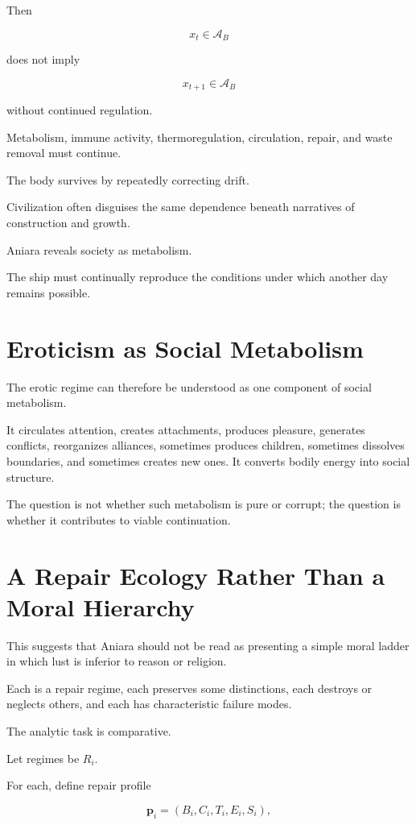 \documentclass[11pt,oneside]{book}
\theoremstyle{definition}
\theoremstyle{remark}
\newcommand{\A}{\mathcal{A}}
\begin{document}
Then

\[
x_t\in\A_B
\]

does not imply

\[
x_{t+1}\in\A_B
\]

without continued regulation.

Metabolism, immune activity, thermoregulation, circulation, repair, and waste removal must continue.

The body survives by repeatedly correcting drift.

Civilization often disguises the same dependence beneath narratives of construction and growth.

Aniara reveals society as metabolism.

The ship must continually reproduce the conditions under which another day remains possible.

\section{Eroticism as Social Metabolism}

The erotic regime can therefore be understood as one component of social metabolism.

It circulates attention, creates attachments, produces pleasure, generates conflicts, reorganizes alliances, sometimes produces children, sometimes dissolves boundaries, and sometimes creates new ones. It converts bodily energy into social structure.

The question is not whether such metabolism is pure or corrupt; the question is whether it contributes to viable continuation.

\section{A Repair Ecology Rather Than a Moral Hierarchy}

This suggests that Aniara should not be read as presenting a simple moral ladder in which lust is inferior to reason or religion.

Each is a repair regime, each preserves some distinctions, each destroys or neglects others, and each has characteristic failure modes.

The analytic task is comparative.

Let regimes be \(R_i\).

For each, define repair profile

\[
\mathbf p_i
=
(
B_i,
C_i,
T_i,
E_i,
S_i
),
\]
\end{document}
